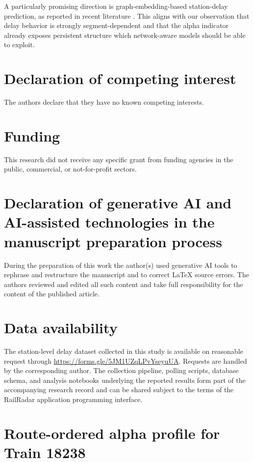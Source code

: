 \documentclass[a4paper,fleqn]{cas-dc}
\begin{document}
A particularly promising direction is graph-embedding-based station-delay
prediction, as reported in recent literature \citep{chowdhury2025rstgcn}. This
aligns with our observation that delay behavior is strongly segment-dependent
and that the alpha indicator already exposes persistent structure which
network-aware models should be able to exploit.

\section*{Declaration of competing interest}

The authors declare that they have no known competing interests.

\section*{Funding}

This research did not receive any specific grant from funding agencies in the
public, commercial, or not-for-profit sectors.

\section*{Declaration of generative AI and AI-assisted technologies in the manuscript preparation process}

During the preparation of this work the author(s) used generative AI tools to
rephrase and restructure the manuscript and to correct LaTeX source errors. The
authors reviewed and edited all such content and take full responsibility for
the content of the published article.

\section*{Data availability}

The station-level delay dataset collected in this study is available on
reasonable request through \url{https://forms.gle/5JM1UZqLPvYseyuUA}.
Requests are handled by the corresponding author. The collection pipeline,
polling scripts, database schema, and analysis notebooks underlying the
reported results form part of the accompanying research record and can be
shared subject to the terms of the RailRadar application programming
interface.

\appendix

\section{Route-ordered alpha profile for Train 18238}
\label{app:alpha}
\end{document}
